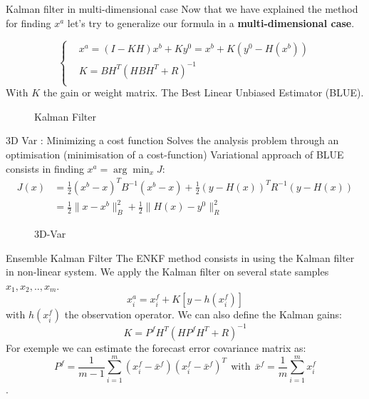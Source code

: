 	\begin{frame}{Kalman filter in multi-dimensional case}
       Now that we have explained the method for finding $x^a$ let's try to generalize our formula in a \textbf{multi-dimensional case}.
   
       $$\left\{\begin{aligned}
	     &x^a=(I-KH)x^b+Ky^0=x^b+K(y^0-H(x^b)) \\
	           &K=BH^T(HBH^T+R)^{-1} \\
	    \end{aligned}\right.$$
       With $K$ the gain or weight matrix.
       The Best Linear Unbiased Estimator (BLUE).
       \begin{figure}[H]
           \caption{Kalman Filter}
       \end{figure}
   \end{frame}
   \begin{frame}{3D Var : Minimizing a cost function}
       Solves the analysis problem through an optimisation (minimisation of a cost-function)
       Variational approach of BLUE consists in finding $x^a=\arg\min_{x}J$:
       $$\begin{aligned}
           J(x)&=\frac{1}{2}(x^b-x)^TB^{-1}(x^b-x)+\frac{1}{2}(y-H(x))^TR^{-1}(y-H(x)) \\
           &=\frac{1}{2}\|x-x^b\|_B^2+\frac{1}{2}\|H(x)-y^0\|_R^2
       \end{aligned}$$
       \begin{figure}
           \centering
           \caption{3D-Var}
       \end{figure}
   \end{frame}
   \begin{frame}{Ensemble Kalman Filter}
       The ENKF method consists in using the Kalman filter in non-linear system.
       \newline We apply the Kalman filter on several state samples $x_1,x_2,..,x_{m}$.
       $$x_i^a=x_i^f+K[y-h(x_i^f)]$$
       with $h(x_i^f)$ the observation operator.
       We can also define the Kalman gains: 
       $$K=P^f H^T(HP^f H^T+R)^{-1}$$
       For exemple we can estimate the
       forecast error covariance matrix as:
       $$P^f=\frac{1}{m-1}\sum_{i=1}^{m}(x_i^f-\bar{x}^f)(x_i^f-\bar{x}^f)^T~~\text{with}~~\bar{x}^f=\frac{1}{m}\sum_{i=1}^{m}x_i^f $$ .
   \end{frame}

